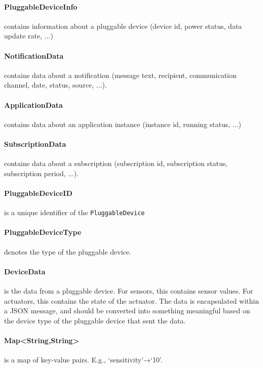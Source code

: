     \paragraph{PluggableDeviceInfo}
               contains information about a pluggable device (device id,
               power status, data update rate, ...)
    \paragraph{NotificationData}
               contains data about a notification (message text, recipient,
               communication channel, date, status, source, ...).
    \paragraph{ApplicationData}
               contains data about an application instance (instance id, running status, ...)
    \paragraph{SubscriptionData}
               contains data about a subscription (subscription id, subscription status,
               subscription period, ...).
    \paragraph{PluggableDeviceID}
               is a unique identifier of the \texttt{PluggableDevice}
    \paragraph{PluggableDeviceType}
              denotes the type of the pluggable device.
    \paragraph{DeviceData}
               is the data from a pluggable device. For sensors, this contains sensor values.
               For actuators, this  contains the state of the actuator.
               The data is encapsulated within a JSON message, and should be
               converted into something meaningful based on the device type of
               the pluggable device that sent the data.
    \paragraph{Map<String,String>}
               is a map of key-value pairs.  E.g., ‘sensitivity’→‘10’.


